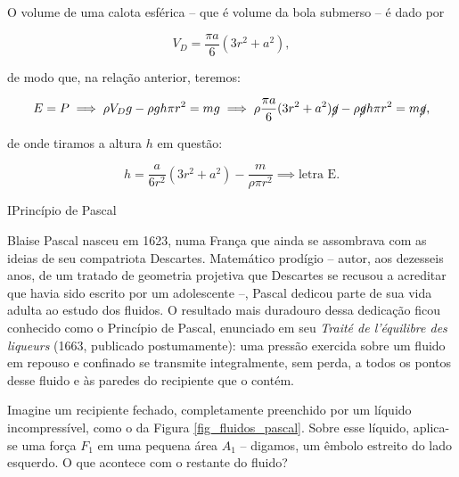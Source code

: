 \begin{exemplo}
O volume de uma calota esférica -- que é volume da bola submerso -- é dado por

$$ V_D = \dfrac{\pi a}{6}(3r^2+a^2),$$

\noindent de modo que, na relação anterior, teremos:

$$ E = P \implies   \rho V_D g - \rho gh \pi r^2 = mg \implies   \rho \dfrac{\pi a}{6}(3r^2+a^2) \cancel  g - \rho \cancel gh \pi r^2 = m \cancel g, $$

\noindent de onde tiramos a altura $h$ em questão:

$$ \boxed{h = \dfrac{a}{6r^2}(3r^2+ a^2) - \dfrac{m}{\rho \pi r^2} \implies \text{letra E}.}$$





\end{exemplo}


\vspace{0.3cm}






\begin{secnivel}{I}{Princípio de Pascal}
  

\end{secnivel}






Blaise Pascal nasceu em 1623, numa França que ainda se assombrava com as ideias de seu compatriota Descartes. Matemático prodígio -- autor, aos dezesseis anos, de um tratado de geometria projetiva que Descartes se recusou a acreditar que havia sido escrito por um adolescente --, Pascal dedicou parte de sua vida adulta ao estudo dos fluidos. O resultado mais duradouro dessa dedicação ficou conhecido como o Princípio de Pascal, enunciado em seu \textit{Traité de l'équilibre des liqueurs} (1663, publicado postumamente): uma pressão exercida sobre um fluido em repouso e confinado se transmite integralmente, sem perda, a todos os pontos desse fluido e às paredes do recipiente que o contém.


Imagine um recipiente fechado, completamente preenchido por um líquido incompressível, como o da Figura \ref{fig_fluidos_pascal}. Sobre esse líquido, aplica-se uma força $F_1$ em uma pequena área $A_1$ -- digamos, um êmbolo estreito do lado esquerdo. O que acontece com o restante do fluido?


